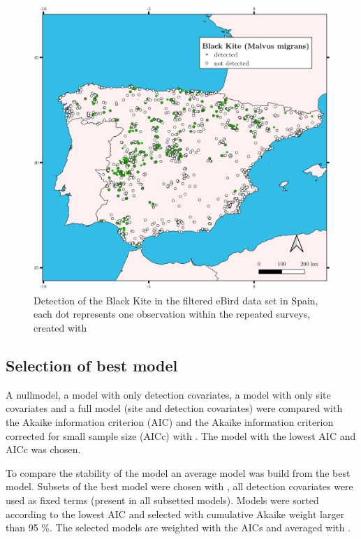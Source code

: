 \begin{multicols}{2}
\begin{figure}[t]
	\centering
	\includegraphics[width=0.6\linewidth]{img/occurences}
	\caption{Detection of the Black Kite in the filtered eBird data set in Spain, each dot represents one observation within the repeated surveys, created with \textcite{QGIS_software}}
	\label{fig:occurences}
\end{figure}


\subsection*{Selection of best model}
A nullmodel, a model with only detection covariates, a model with only site covariates and a full model (site and detection covariates) were compared with the Akaike information criterion (AIC) and the Akaike information criterion corrected for small sample size (AICc) with \textcite{unmarked}. The model with the lowest AIC and AICc was chosen. 

To compare the stability of the model an average model was build from the best model. Subsets of the best model were chosen with \textcite{Barton2020}, all detection covariates were used as fixed terms (present in all subsetted models). Models were sorted according to the lowest AIC and selected with cumulative Akaike weight \parencite{Wagenmakers2004} larger than 95 \%. The selected models are weighted with the AICs and averaged with \textcite{Barton2020}.


\end{multicols}
